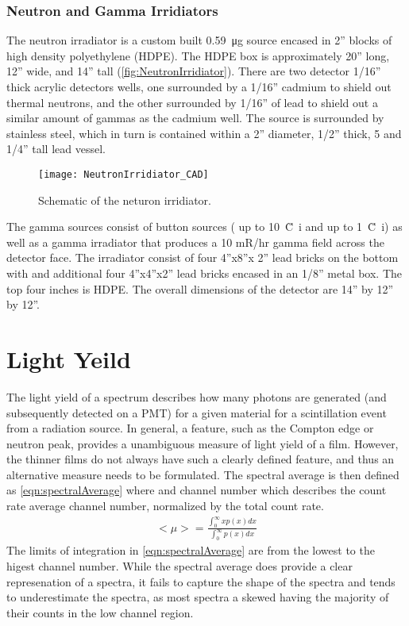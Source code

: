 \subsubsection{Neutron and Gamma Irridiators}
The neutron irradiator is a custom built \SI{0.59}{\ug}  source encased in 2” blocks of high density polyethylene (HDPE). 
The HDPE box is approximately 20” long, 12” wide, and 14” tall (\autoref{fig:NeutronIrridiator}). 
There are two detector 1/16” thick acrylic detectors wells, one surrounded by a 1/16” cadmium to shield out thermal neutrons, and the other surrounded by 1/16” of lead to shield out a similar amount of gammas as the cadmium well.
The  source is surrounded by stainless steel, which in turn is contained within a 2” diameter, 1/2” thick, 5 and 1/4” tall lead vessel.
\begin{figure}
  \centering
  \texttt{[image: NeutronIrridiator\_CAD]}
  \caption[CAD Rendering of Neutron Irridiator]{Schematic of the neturon irridiator.}
  \label{fig:NeutronIrridiator}
\end{figure}
The gamma sources consist of button sources ( up to \SI{10}{\u Ci} and  up to \SI{1}{\u Ci}) as well as a gamma irradiator that produces a 10 mR/hr gamma field across the detector face. 
The irradiator consist of four 4”x8”x 2” lead bricks on the bottom with and additional four 4”x4”x2” lead bricks encased in an 1/8” metal box. 
The top four inches is HDPE. 
The overall dimensions of the detector are 14” by 12” by 12”. 

\section{Light Yeild}
The light yield of a spectrum describes how many photons are generated (and subsequently detected on a PMT) for a given material for a scintillation event from a radiation source.
In general, a feature, such as the Compton edge or neutron peak,  provides a unambiguous measure of light yield of a film. 
However, the thinner films do not always have such a clearly defined feature, and thus an alternative measure needs to be formulated.
The spectral average is then defined as \eqref{eqn:spectralAverage} where  and  {channel number} which describes the count rate average channel number, normalized by the total count rate.
\begin{align}
	<\mu> = \frac{\int_0^\infty x p(x) dx}{\int_0^\infty p(x) dx}
	\label{eqn:spectralAverage}
\end{align}
The limits of integration in \eqref{eqn:spectralAverage} are from the lowest to the higest channel number.
While the spectral average does provide a clear represenation of a spectra, it fails to capture the shape of the spectra and tends to underestimate the spectra, as most spectra a skewed having the majority of their counts in the low channel region.

